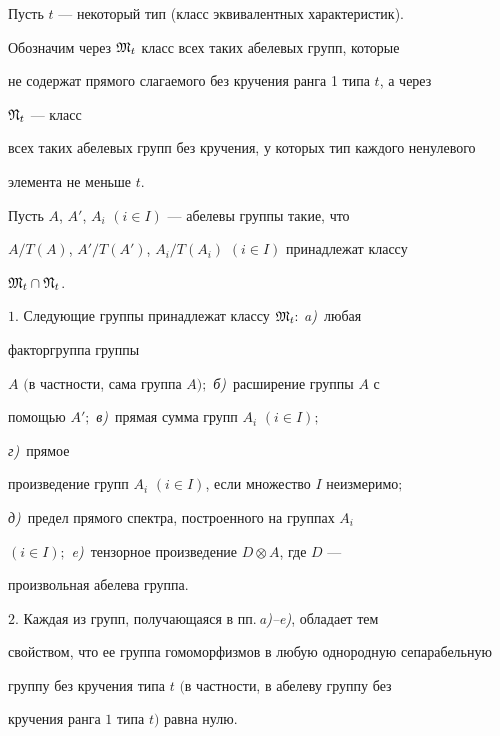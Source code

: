  


Пусть $t$ --- некоторый тип (класс эквивалентных характеристик). 


Обозначим через $\frak M_t$ класс всех таких абелевых групп, которые 


не содержат прямого слагаемого без кручения ранга 1 типа $t$, а через 


$\frak N_t$ --- класс 


всех таких абелевых групп без кручения, у которых тип каждого ненулевого 


элемента не меньше $t$. 


 


\begin{thm} 


Пусть $A$, $A'$, $A_i$ $(i\in I)$ --- абелевы группы такие, что 


$A/T(A)$, $A'/T(A')$, $A_i/T(A_i)$ $(i\in I)$ принадлежат классу 


$\frak M_t\cap\frak N_t$. 


 


$1.$ Следующие группы принадлежат классу $\frak M_t{:}$ {\em a)}~любая 


факторгруппа группы


$A$ $($в частности, сама группа $A);$ {\em б)}~расширение группы $A$ с 


помощью $A';$ {\em в)}~прямая сумма групп $A_i$ $(i\in I);$ 


{\em г)}~прямое 


произведение групп $A_i$ $(i\in I)$, если множество $I$ неизмеримо$;$ 


{\em д)}~предел прямого спектра, построенного на группах $A_i$ 


$(i\in I);$ {\em e)}~тензорное произведение $D\otimes A$, где $D$ --- 


произвольная абелева группа. 


 


$2.$ Каждая из групп, получающаяся в пп.\,{\em a)--e)}, обладает тем 


свойством, что ее группа гомоморфизмов в любую однородную сепарабельную 


группу без кручения типа $t$ $($в частности, в абелеву группу без 


кручения ранга $1$ типа $t)$ равна нулю. 


\end{thm} 


